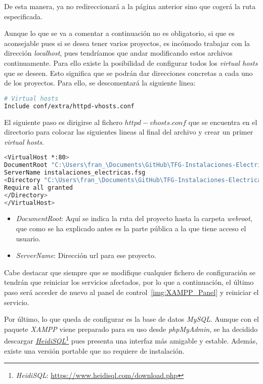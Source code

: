 De esta manera, ya no redireccionará a la página anterior sino que cogerá la ruta especificada.

Aunque lo que se va a comentar a continuación no es obligatorio, si que es aconsejable pues si se desea tener varios proyectos, es incómodo trabajar con la dirección \textit{localhost}, pues tendríamos que andar modificando estos archivos continuamente. Para ello existe la posibilidad de configurar todos los \textit{virtual hosts} que se deseen. Esto significa que se podrán dar direcciones concretas a cada uno de los proyectos. Para ello, se descomentará la siguiente linea:

\begin{lstlisting}[language=bash]
# Virtual hosts
Include conf/extra/httpd-vhosts.conf
\end{lstlisting}

El siguiente paso es dirigirse al fichero $httpd-vhosts.conf$ que se encuentra en el directorio \textit{} para colocar las siguientes lineas al final del archivo y crear un primer \textit{virtual hosts}.

\begin{lstlisting}[language=bash]
<VirtualHost *:80>
DocumentRoot "C:\Users\fran_\Documents\GitHub\TFG-Instalaciones-Electricas\web\instalaciones_electricas\webroot"
ServerName instalaciones_electricas.fsg
<Directory "C:\Users\fran_\Documents\GitHub\TFG-Instalaciones-Electricas\web\instalaciones_electricas\webroot">
Require all granted
</Directory>
</VirtualHost>
\end{lstlisting}

\begin{itemize}
\item \textit{DocumentRoot}: Aquí se indica la ruta del proyecto hasta la carpeta \textit{webroot}, que como se ha explicado antes es la parte pública a la que tiene acceso el usuario.
\item \textit{ServerName}: Dirección url para ese proyecto.
\end{itemize}

Cabe destacar que siempre que se modifique cualquier fichero de configuración se tendrán que reiniciar los servicios afectados, por lo que a continuación, el último paso será acceder de nuevo al panel de control~\ref{img:XAMPP_Panel} y reiniciar el servicio.

Por último, lo que queda de configurar es la base de datos \textit{MySQL}. Aunque con el paquete \textit{XAMPP} viene preparado para su uso desde \textit{phpMyAdmin}, se ha decidido descargar \href{https://www.heidisql.com/download.php}{\textit{HeidiSQL}}\footnote{\textit{HeidiSQL}: \url{https://www.heidisql.com/download.php}} pues presenta una interfaz más amigable y estable. Además, existe una versión portable que no requiere de instalación.

